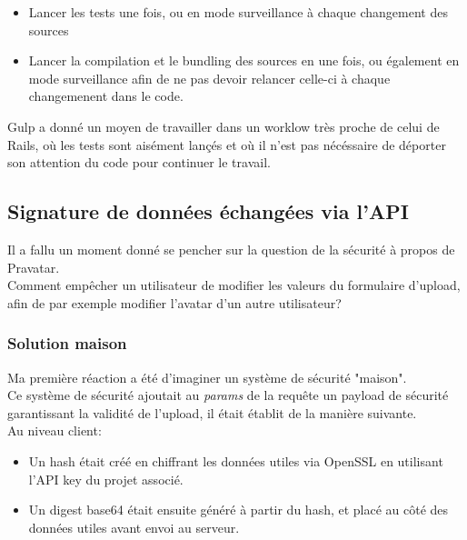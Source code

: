 \documentclass{report}
\begin{document}
        \begin{itemize}
          \item Lancer les tests une fois, ou en mode surveillance à chaque changement des sources
          \item Lancer la compilation et le bundling des sources en une fois, ou également en mode surveillance afin de ne pas devoir relancer celle-ci à chaque changemenent dans le code.\\
        \end{itemize}

        Gulp a donné un moyen de travailler dans un worklow très proche de celui de Rails, où les tests sont aisément lançés et où il n'est pas nécéssaire de déporter
        son attention du code pour continuer le travail.\\

      \subsection{Signature de données échangées via l'API}
      \label{sub:Signature de données échangées via l'API}

        Il a fallu un moment donné se pencher sur la question de la sécurité à propos de Pravatar.\\
        Comment empêcher un utilisateur de modifier les valeurs du formulaire d'upload, afin de par exemple modifier l'avatar d'un autre utilisateur?\\

        \subsubsection{Solution maison}
        \label{subs:Solution maison}

          Ma première réaction a été d'imaginer un système de sécurité "maison".\\

          Ce système de sécurité ajoutait au \textit{params} de la requête un payload de sécurité garantissant la validité de l'upload, il était établit de la manière suivante.\\

          Au niveau client:\\

          \begin{itemize}
            \item Un hash était créé en chiffrant les données utiles via OpenSSL en utilisant l'API key du projet associé.
            \item Un digest base64 était ensuite généré à partir du hash, et placé au côté des données utiles avant envoi au serveur.\\
          \end{itemize}
\end{document}
